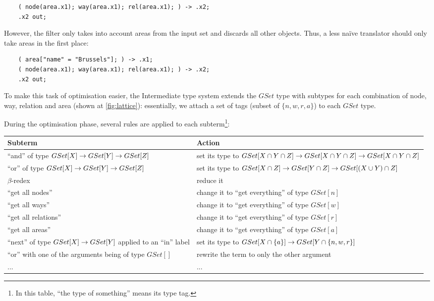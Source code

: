 \documentclass[main.tex]{subfiles}
\begin{document}
\begin{example}
\begin{lstlisting}
    ( node(area.x1); way(area.x1); rel(area.x1); ) -> .x2;
    .x2 out;
\end{lstlisting}
However, the  filter only takes into account areas from the
input set and discards all other objects. Thus, a less naïve translator should
only take areas in the first place:
\begin{lstlisting}
    ( area["name" = "Brussels"]; ) -> .x1;
    ( node(area.x1); way(area.x1); rel(area.x1); ) -> .x2;
    .x2 out;
\end{lstlisting}
\end{example}

To make this task of optimisation easier, the Intermediate type system extends the $GSet$
type with subtypes for each combination of node, way, relation and area
(shown at \cref{fig:lattice}): essentially, we attach a set of tags (subset
of $\{ n, w, r, a \}$) to each $GSet$ type.

During the optimisation phase, several rules are applied to each subterm\footnote{
    In this table, ``the type of something'' means its type tag.
}:
\begin{center}
\begin{tabular}{|p{}|p{}|}
    \hline
    Subterm & Action \\
    \hline
    ``and'' of type $GSet[X] \rightarrow GSet[Y] \rightarrow GSet[Z]$
        & set its type to $GSet[X \cap Y \cap Z] \rightarrow GSet[X \cap Y \cap Z] \rightarrow GSet[X \cap Y \cap Z]$ \\
    \hline
    ``or'' of type $GSet[X] \rightarrow GSet[Y] \rightarrow GSet[Z]$
        & set its type to $GSet[X \cap Z] \rightarrow GSet[Y \cap Z] \rightarrow GSet[(X \cup Y) \cap Z]$ \\
    \hline
    $\beta$-redex & reduce it \\
    \hline
    ``get all nodes'' & change it to ``get everything'' of type $GSet[n]$ \\
    ``get all ways'' & change it to ``get everything'' of type $GSet[w]$ \\
    ``get all relations'' & change it to ``get everything'' of type $GSet[r]$ \\
    ``get all areas'' & change it to ``get everything'' of type $GSet[a]$ \\
    \hline
    ``next'' of type $GSet[X] \rightarrow GSet[Y]$ applied to an ``in'' label
        & set its type to $GSet[X \cap \{ a \}] \rightarrow GSet[Y \cap \{ n, w, r \}]$ \\
    \hline
    ``or'' with one of the arguments being of type $GSet[]$
        & rewrite the term to only the other argument \\
    \hline
    ... & ... \\
    \hline
\end{tabular}
\end{center}
\end{document}
